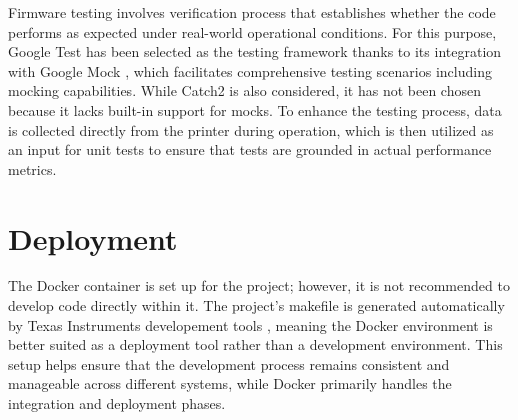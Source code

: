 Firmware testing involves verification process that establishes whether the code performs as expected under real-world operational conditions. For this purpose, Google Test \cite{google-test} has been selected as the testing framework thanks to its integration with Google Mock \cite{google-mock}, which facilitates comprehensive testing scenarios including mocking capabilities. While Catch2 \cite{catch2} is also considered, it has not been chosen because it lacks built-in support for mocks. To enhance the testing process, data is collected directly from the printer during operation, which is then utilized as an input for unit tests to ensure that tests are grounded in actual performance metrics.

\section{Deployment}

The Docker container \cite{docker} is set up for the project; however, it is not recommended to develop code directly within it. The project’s makefile is generated automatically by Texas Instruments developement tools \cite{ccs}, meaning the Docker environment is better suited as a deployment tool rather than a development environment. This setup helps ensure that the development process remains consistent and manageable across different systems, while Docker primarily handles the integration and deployment phases.

